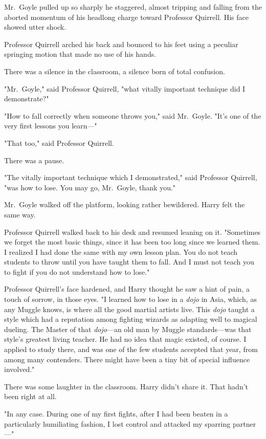 Mr.~Goyle pulled up so sharply he staggered, almost tripping and falling from 
the aborted momentum of his headlong charge toward Professor Quirrell. His face 
showed utter shock.

Professor Quirrell arched his back and bounced to his feet using a peculiar 
springing motion that made no use of his hands.

There was a silence in the classroom, a silence born of total confusion.

"Mr.~Goyle," said Professor Quirrell, "what vitally important technique did I 
demonstrate?"

"How to fall correctly when someone throws you," said Mr.~Goyle. "It's one of 
the very first lessons you learn---"

"That too," said Professor Quirrell.

There was a pause.

"The vitally important technique which I demonstrated," said Professor 
Quirrell, "was how to lose. You may go, Mr.~Goyle, thank you."

Mr.~Goyle walked off the platform, looking rather bewildered. Harry felt the 
same way.

Professor Quirrell walked back to his desk and resumed leaning on it. 
"Sometimes we forget the most basic things, since it has been too long since we 
learned them. I realized I had done the same with my own lesson plan. You do 
not teach students to throw until you have taught them to fall. And I must not 
teach you to fight if you do not understand how to lose."

Professor Quirrell's face hardened, and Harry thought he saw a hint of pain, a 
touch of sorrow, in those eyes. "I learned how to lose in a \emph{dojo} in 
Asia, which, as any Muggle knows, is where all the good martial artists live. 
This \emph{dojo} taught a style which had a reputation among fighting wizards 
as adapting well to magical dueling. The Master of that \emph{dojo}---an old 
man by Muggle standards---was that style's greatest living teacher. He had no 
idea that magic existed, of course. I applied to study there, and was one of 
the few students accepted that year, from among many contenders. There might 
have been a tiny bit of special influence involved."

There was some laughter in the classroom. Harry didn't share it. That hadn't 
been right at all.

"In any case. During one of my first fights, after I had been beaten in a 
particularly humiliating fashion, I lost control and attacked my sparring 
partner---"

